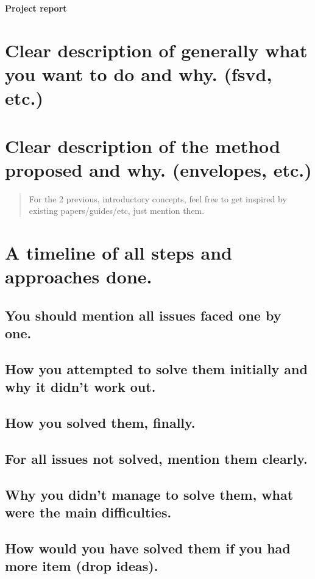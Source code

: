 \documentclass[11pt,a4paper,english]{article}
\begin{document}
    {\centering\huge\textbf{Project report}\par}

    \vspace{1cm}

    \section{Clear description of generally what you want to do and why. (fsvd, etc.)}

    \section{Clear description of the method proposed and why. (envelopes, etc.)}
    
    \begin{quote}
    For the 2 previous, introductory concepts, feel free to get inspired by existing papers/guides/etc, just mention them.
    \end{quote}
    
    \section{A timeline of all steps and approaches done.}
    
    \subsection{You should mention all issues faced one by one.}
    \subsection{How you attempted to solve them initially and why it didn't work out.}
    \subsection{How you solved them, finally.}
    \subsection{For all issues not solved, mention them clearly.}
    \subsection{Why you didn't manage to solve them, what were the main difficulties.}
    \subsection{How would you have solved them if you had more item (drop ideas).}
\end{document}
